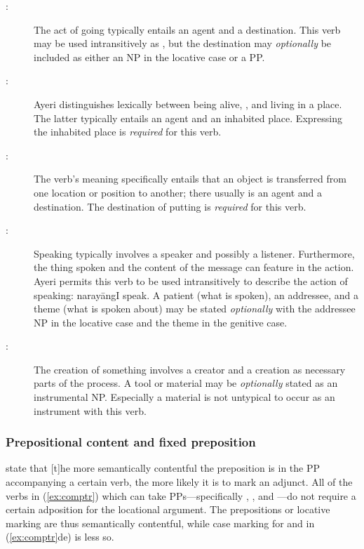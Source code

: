 \begin{description}
	\item[:] The act of going typically entails an
	agent and a destination. This verb may be used intransitively as
	, but the destination may \emph{optionally}
	be included as either an NP in the locative case or a PP.

	\item[:] Ayeri distinguishes
	lexically between being alive, , and living in a place.
	The latter typically entails an agent and an inhabited place. Expressing
	the inhabited place is \emph{required} for this verb.

	\item[:] The verb's meaning specifically
	entails that an object is transferred from one location or position to
	another; there usually is an agent and a destination. The destination of
	putting is \emph{required} for this verb.

	\item[:] Speaking typically involves
	a speaker and possibly a listener. Furthermore, the thing spoken and the
	content of the message can feature in the action. Ayeri permits this verb
	to be used intransitively to describe the action of speaking:
	 {narayāng}{I speak}. A patient (what is spoken), an
	addressee, and a theme (what is spoken about) may be stated
	\emph{optionally} with the addressee NP in the locative case and the theme
	in the genitive case.

	\item[:] The creation of something involves
	a creator and a creation as necessary parts of the process. A tool or
	material may be \emph{optionally} stated as an instrumental NP. Especially
	a material is not untypical to occur as an instrument with this verb.
\end{description}

\subsubsection{Prepositional content and fixed preposition}

\citet{needhamtoivonen2011} state that 
{[t]he more semantically contentful the preposition is in the PP accompanying a
certain verb, the more likely it is to mark an adjunct}. All of the verbs in
(\ref{ex:comptr}) which can take PPs---specifically ,
, and ---do not require a
certain adposition for the locational argument. The prepositions or locative
marking are thus semantically contentful, while case marking for
 and  in (\ref{ex:comptr}de) is
less so.

